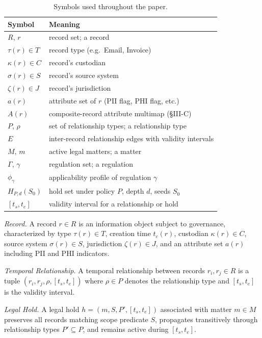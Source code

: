 \documentclass{ieeeaccess}
\begin{document}
\begin{table}[h]
\centering
\caption{Symbols used throughout the paper.}
\label{tab:symbols}
\small
\begin{tabular}{ll}
\hline\hline
Symbol & Meaning \\
\hline
$R$, $r$ & record set; a record \\
$\tau(r) \in T$ & record type (e.g.\ Email, Invoice) \\
$\kappa(r) \in C$ & record's custodian \\
$\sigma(r) \in S$ & record's source system \\
$\zeta(r) \in J$ & record's jurisdiction \\
$a(r)$ & attribute set of $r$ (PII flag, PHI flag, etc.) \\
$A(r)$ & composite-record attribute multimap (§III-C) \\
$P$, $\rho$ & set of relationship types; a relationship type \\
$E$ & inter-record relationship edges with validity intervals \\
$M$, $m$ & active legal matters; a matter \\
$\Gamma$, $\gamma$ & regulation set; a regulation \\
$\phi_\gamma$ & applicability profile of regulation $\gamma$ \\
$H_{P,d}(S_0)$ & hold set under policy $P$, depth $d$, seeds $S_0$ \\
$[t_s, t_e]$ & validity interval for a relationship or hold \\
\hline\hline
\end{tabular}
\end{table}

\textit{Record.} A record $r \in R$ is an information object subject to governance, characterized by type $\tau(r) \in T$, creation time $t_c(r)$, custodian $\kappa(r) \in C$, source system $\sigma(r) \in S$, jurisdiction $\zeta(r) \in J$, and an attribute set $a(r)$ including PII and PHI indicators.

\textit{Temporal Relationship.} A temporal relationship between records $r_i, r_j \in R$ is a tuple $(r_i, r_j, \rho, [t_s, t_e])$ where $\rho \in P$ denotes the relationship type and $[t_s, t_e]$ is the validity interval.

\textit{Legal Hold.} A legal hold $h = (m, S, P', [t_s, t_e])$ associated with matter $m \in M$ preserves all records matching scope predicate $S$, propagates transitively through relationship types $P' \subseteq P$, and remains active during $[t_s, t_e]$.
\end{document}

